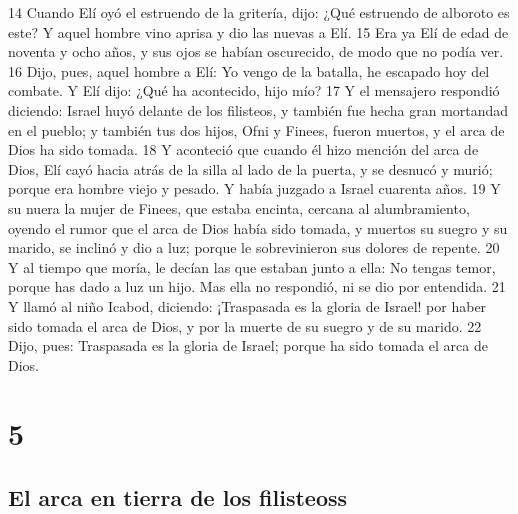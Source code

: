 14 Cuando Elí oyó el estruendo de la gritería, dijo: ¿Qué estruendo de alboroto es este? Y aquel hombre vino aprisa y dio las nuevas a Elí.
15 Era ya Elí de edad de noventa y ocho años, y sus ojos se habían oscurecido, de modo que no podía ver.
16 Dijo, pues, aquel hombre a Elí: Yo vengo de la batalla, he escapado hoy del combate. Y Elí dijo: ¿Qué ha acontecido, hijo mío?
17 Y el mensajero respondió diciendo: Israel huyó delante de los filisteos, y también fue hecha gran mortandad en el pueblo; y también tus dos hijos, Ofni y Finees, fueron muertos, y el arca de Dios ha sido tomada. 
18 Y aconteció que cuando él hizo mención del arca de Dios, Elí cayó hacia atrás de la silla al lado de la puerta, y se desnucó y murió; porque era hombre viejo y pesado. Y había juzgado a Israel cuarenta años.
19 Y su nuera la mujer de Finees, que estaba encinta, cercana al alumbramiento, oyendo el rumor que el arca de Dios había sido tomada, y muertos su suegro y su marido, se inclinó y dio a luz; porque le sobrevinieron sus dolores de repente.
20 Y al tiempo que moría, le decían las que estaban junto a ella: No tengas temor, porque has dado a luz un hijo. Mas ella no respondió, ni se dio por entendida.
21 Y llamó al niño Icabod, diciendo: ¡Traspasada es la gloria de Israel! por haber sido tomada el arca de Dios, y por la muerte de su suegro y de su marido.
22 Dijo, pues: Traspasada es la gloria de Israel; porque ha sido tomada el arca de Dios.

\chapter{5}

\section*{El arca en tierra de los filisteoss}

